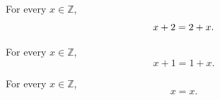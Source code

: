 \begin{lemma}\label{branch-a}For every $x\in\mathbb{Z}$,\[x+2=2+x.\]\end{lemma}
\begin{lemma}\label{branch-b}For every $x\in\mathbb{Z}$,\[x+1=1+x.\]\end{lemma}
\begin{lemma}\label{branch-c}For every $x\in\mathbb{Z}$,\[x=x.\]\end{lemma}
